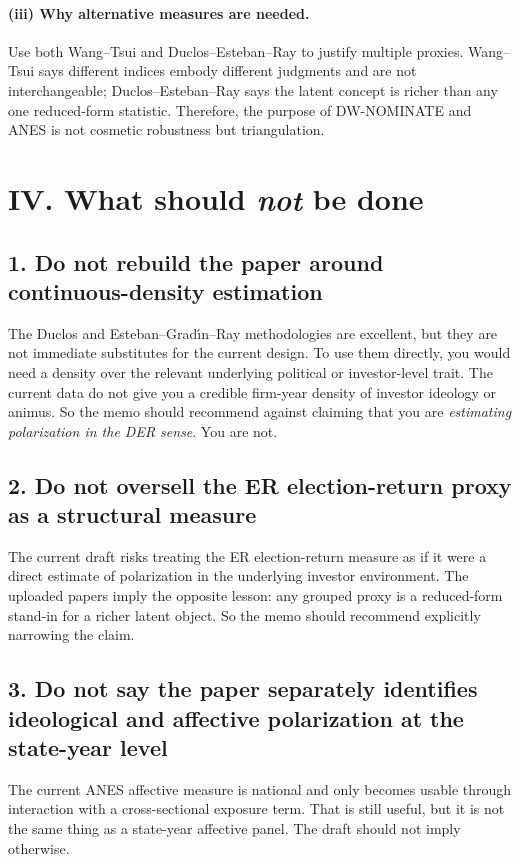 \documentclass[12pt]{article}
\begin{document}
\paragraph{(iii) Why alternative measures are needed.}
Use both Wang--Tsui and Duclos--Esteban--Ray to justify multiple proxies. Wang--Tsui says different indices embody different judgments and are not interchangeable; Duclos--Esteban--Ray says the latent concept is richer than any one reduced-form statistic. Therefore, the purpose of DW-NOMINATE and ANES is not cosmetic robustness but triangulation.

\section*{IV. What should \emph{not} be done}

\subsection*{1. Do not rebuild the paper around continuous-density estimation}
The Duclos and Esteban--Grad\'{\i}n--Ray methodologies are excellent, but they are not immediate substitutes for the current design. To use them directly, you would need a density over the relevant underlying political or investor-level trait. The current data do not give you a credible firm-year density of investor ideology or animus. So the memo should recommend against claiming that you are \emph{estimating polarization in the DER sense}. You are not.

\subsection*{2. Do not oversell the ER election-return proxy as a structural measure}
The current draft risks treating the ER election-return measure as if it were a direct estimate of polarization in the underlying investor environment. The uploaded papers imply the opposite lesson: any grouped proxy is a reduced-form stand-in for a richer latent object. So the memo should recommend explicitly narrowing the claim.

\subsection*{3. Do not say the paper separately identifies ideological and affective polarization at the state-year level}
The current ANES affective measure is national and only becomes usable through interaction with a cross-sectional exposure term. That is still useful, but it is not the same thing as a state-year affective panel. The draft should not imply otherwise.
\end{document}
